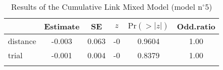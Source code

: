 \begin{table}
\begin{tabular}{l S[table-format=-1.3] S[table-format=1.3] S[table-format=-1] S[table-format=1.4] S[table-format=1.2]}
  \lsptoprule
 & {Estimate} & {SE} & {$z$} & {$\text{Pr}(>|z|)$} & {Odd.ratio} \\ 
  \midrule
  distance & -0.003 & 0.063 & -0 & 0.9604 & 1.00 \\ 
  trial    & -0.001 & 0.004 & -0 & 0.8379 & 1.00 \\ 
 \lspbottomrule
\end{tabular}
\caption{Results of the Cumulative Link Mixed Model (model n$^{\circ}$5)}
\label{tab:exp1-m5}
\end{table}
